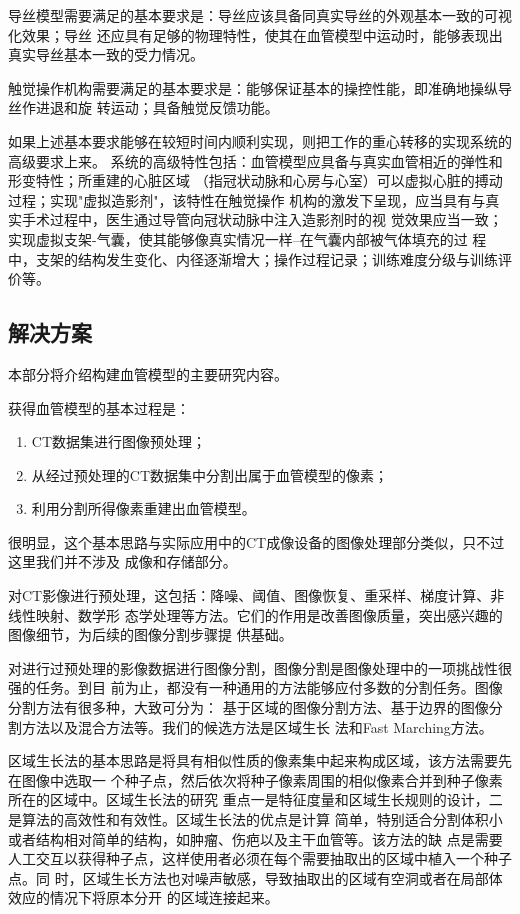 导丝模型需要满足的基本要求是：导丝应该具备同真实导丝的外观基本一致的可视化效果；导丝
还应具有足够的物理特性，使其在血管模型中运动时，能够表现出真实导丝基本一致的受力情况。

触觉操作机构需要满足的基本要求是：能够保证基本的操控性能，即准确地操纵导丝作进退和旋
转运动；具备触觉反馈功能。

如果上述基本要求能够在较短时间内顺利实现，则把工作的重心转移的实现系统的高级要求上来。
系统的高级特性包括：血管模型应具备与真实血管相近的弹性和形变特性；所重建的心脏区域
（指冠状动脉和心房与心室）可以虚拟心脏的搏动过程；实现"虚拟造影剂"，该特性在触觉操作
机构的激发下呈现，应当具有与真实手术过程中，医生通过导管向冠状动脉中注入造影剂时的视
觉效果应当一致；实现虚拟支架-气囊，使其能够像真实情况一样--在气囊内部被气体填充的过
程中，支架的结构发生变化、内径逐渐增大；操作过程记录；训练难度分级与训练评价等。

\subsection{解决方案}
\label{subsec1-1-3}

本部分将介绍构建血管模型的主要研究内容。

获得血管模型的基本过程是：
\begin{enumerate}
  \item CT数据集进行图像预处理；
  \item 从经过预处理的CT数据集中分割出属于血管模型的像素；
  \item 利用分割所得像素重建出血管模型。
\end{enumerate}
很明显，这个基本思路与实际应用中的CT成像设备的图像处理部分类似，只不过这里我们并不涉及
成像和存储部分。

对CT影像进行预处理，这包括：降噪、阈值、图像恢复、重采样、梯度计算、非线性映射、数学形
态学处理等方法。它们的作用是改善图像质量，突出感兴趣的图像细节，为后续的图像分割步骤提
供基础。

对进行过预处理的影像数据进行图像分割，图像分割是图像处理中的一项挑战性很强的任务。到目
前为止，都没有一种通用的方法能够应付多数的分割任务。图像分割方法有很多种，大致可分为：
基于区域的图像分割方法、基于边界的图像分割方法以及混合方法等。我们的候选方法是区域生长
法和Fast Marching方法。

区域生长法的基本思路是将具有相似性质的像素集中起来构成区域，该方法需要先在图像中选取一
个种子点，然后依次将种子像素周围的相似像素合并到种子像素所在的区域中。区域生长法的研究
重点一是特征度量和区域生长规则的设计，二是算法的高效性和有效性。区域生长法的优点是计算
简单，特别适合分割体积小或者结构相对简单的结构，如肿瘤、伤疤以及主干血管等。该方法的缺
点是需要人工交互以获得种子点，这样使用者必须在每个需要抽取出的区域中植入一个种子点。同
时，区域生长方法也对噪声敏感，导致抽取出的区域有空洞或者在局部体效应的情况下将原本分开
的区域连接起来。

